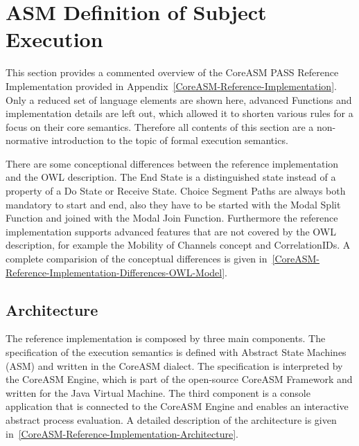 \section{ASM Definition of Subject Execution}


This section provides a commented overview of the CoreASM PASS Reference Implementation provided in Appendix~\ref{CoreASM-Reference-Implementation}.
Only a reduced set of language elements are shown here, advanced Functions and implementation details are left out,
which allowed it to shorten various rules for a focus on their core semantics.
Therefore all contents of this section are a non-normative introduction to the topic of formal execution semantics.

There are some conceptional differences between the reference implementation and the OWL description.
The End State is a distinguished state instead of a property of a Do State or Receive State.
Choice Segment Paths are always both mandatory to start and end, also they have to be started with the Modal Split Function and joined with the Modal Join Function.
Furthermore the reference implementation supports advanced features that are not covered by the OWL description, for example the Mobility of Channels concept and CorrelationIDs.
A complete comparision of the conceptual differences is given in~\ref{CoreASM-Reference-Implementation-Differences-OWL-Model}.



\subsection{Architecture}

The reference implementation is composed by three main components.
The specification of the execution semantics is defined with Abstract State Machines (ASM) %
and written in the CoreASM dialect.
The specification is interpreted by the CoreASM Engine,
which is part of the open-source CoreASM Framework and written for the Java Virtual Machine. %
The third component is a console application that is connected to the CoreASM Engine
and enables an interactive abstract process evaluation.
A detailed description of the architecture is given in~\ref{CoreASM-Reference-Implementation-Architecture}.


